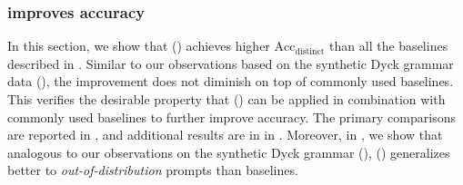 \subsubsection{\algoName improves accuracy}
\label{sec:experiments:codellama:verifier_improves_accuracy}

In this section, we show that 
\algoName ()
achieves higher $\text{Acc}_\text{distinct}$
than all the baselines described in .
Similar to our observations based on the synthetic Dyck grammar data (), 
the improvement does not diminish on top of commonly used baselines.
This verifies the desirable property that 
\algoName 
()
can be applied in combination with commonly used baselines to further improve accuracy.
The primary comparisons are reported in , 
and additional results are in
in . 
Moreover, in ,
we show that 
analogous to our observations on the synthetic Dyck grammar (),
\algoName ()
generalizes better to \emph{out-of-distribution} prompts than baselines.




